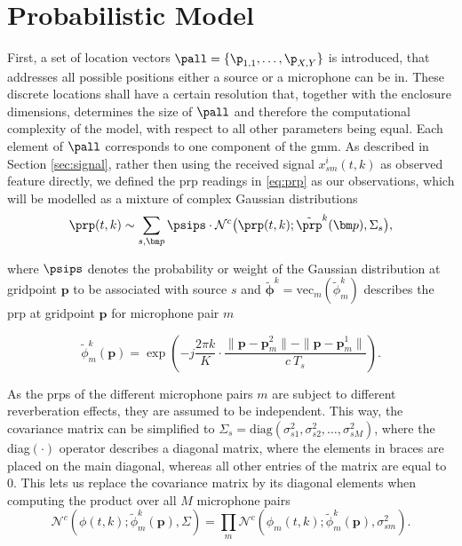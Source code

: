 \section{Probabilistic Model}
\label{sec:prob_model}

First, a set of location vectors $\pall=\{\p_{1,1},\dots,\p_{X,Y}\}$ is introduced, that addresses all possible positions either a source or a microphone can be in. These discrete locations shall have a certain resolution that, together with the enclosure dimensions, determines the size of $\pall$ and therefore the computational complexity of the model, with respect to all other parameters being equal. Each element of $\pall$ corresponds to one component of the \gls{gmm}. 
As described in Section \ref{sec:signal}, rather then using the received signal $x_{sm}^i(t,k)$ as observed feature directly, we defined the \gls{prp} readings in \eqref{eq:prp} as our observations, which will be modelled as a mixture of complex Gaussian distributions
\begin{equation}
	\prp(t,k)\sim\sum_{s,\bm p}\psips\cdot\mathcal{N}^c\big(\prp(t,k);\tilde\prp^k(\bm p),\Sigma_s\big),
\label{eq:phi_gmm}
\end{equation}

where $\psips$ denotes the probability or weight of the Gaussian distribution at gridpoint $\bm p$ to be associated with source $s$ and $\tilde{\bm\phi}^k=\text{vec}_{m}(\tilde\phi^k_m)$ describes the \gls{prp} at gridpoint $\bm p$ for microphone pair $m$

\begin{equation}
    \tilde\phi^k_m(\bm p)=\exp{\left (-j\frac{2\pi k}{K}\cdot\frac{\|\bm p-\bm p^2_m\|-\|\bm p-\bm p^1_m\|}{c~T_s}\right )}.
\label{eq:phi_tilde}
\end{equation}

As the \glspl{prp} of the different microphone pairs $m$ are subject to different reverberation effects, they are assumed to be independent. This way, the covariance matrix can be simplified to $\Sigma_s=\text{diag}(\sigma^2_{s1}, \sigma^2_{s2}, \dots, \sigma^2_{sM})$, where the diag$(\cdot)$ operator describes a diagonal matrix, where the elements in braces are placed on the main diagonal, whereas all other entries of the matrix are equal to 0. This lets us replace the covariance matrix by its diagonal elements when computing the product over all $M$ microphone pairs 
\begin{equation}
    \mathcal{N}^c(\phi(t,k);\tilde\phi^k_m(\bm p),\Sigma)=\prod_m \mathcal{N}^c(\phi_m(t,k);\tilde\phi^k_m(\bm p),\sigma^2_{sm}).
\end{equation}

